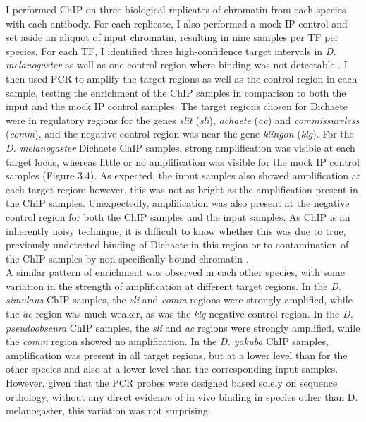 I performed ChIP on three biological replicates of chromatin from each species with each antibody. For each replicate, I also performed a mock IP control and set aside an aliquot of input chromatin, resulting in nine samples per TF per species. For each TF, I identified three high-confidence target intervals in \emph{D. melanogaster} as well as one control region where binding was not detectable \citep{aleksic_role_2013,ferrero_soxneuro_2014}. I then used PCR to amplify the target regions as well as the control region in each sample, testing the enrichment of the ChIP samples in comparison to both the input and the mock IP control samples. The target regions chosen for Dichaete were in regulatory regions for the genes \emph{slit} (\emph{sli}), \emph{achaete} (\emph{ac}) and \emph{commissureless} (\emph{comm}), and the negative control region was near the gene \emph{klingon} (\emph{klg}). For the \emph{D. melanogaster} Dichaete ChIP samples, strong amplification was visible at each target locus, whereas little or no amplification was visible for the mock IP control samples (Figure 3.4). As expected, the input samples also showed amplification at each target region; however, this was not as bright as the amplification present in the ChIP samples. Unexpectedly, amplification was also present at the negative control region for both the ChIP samples and the input samples. As ChIP is an inherently noisy technique, it is difficult to know whether this was due to true, previously undetected binding of Dichaete in this region or to contamination of the ChIP samples by non-specifically bound chromatin \citep{aleksic_chiping_2009,buck_chip-chip:_2004}.\\

A similar pattern of enrichment was observed in each other species, with some variation in the strength of amplification at different target regions. In the \emph{D. simulans} ChIP samples, the \emph{sli} and \emph{comm} regions were strongly amplified, while the \emph{ac} region was much weaker, as was the \emph{klg} negative control region. In the \emph{D. pseudoobscura} ChIP samples, the \emph{sli} and \emph{ac} regions were strongly amplified, while the \emph{comm} region showed no amplification. In the \emph{D. yakuba} ChIP samples, amplification was present in all target regions, but at a lower level than for the other species and also at a lower level than the corresponding input samples. However, given that the PCR probes were designed based solely on sequence orthology, without any direct evidence of in vivo binding in species other than D. melanogaster, this variation was not surprising.\\

